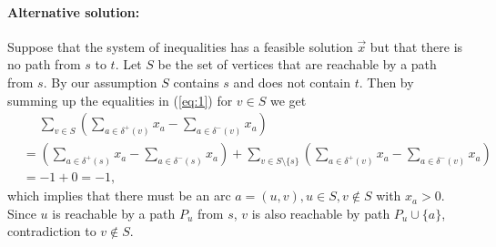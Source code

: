 \documentclass[11pt]{article}
\begin{document}
\begin{enumerate}[a)]
  \paragraph{Alternative solution:}
  Suppose that the system of inequalities has a feasible solution $\vec{x}$ but that there is no path from $s$ to $t$.
 Let $S$ be the set of vertices that are reachable by a path from $s$. By our assumption $S$ contains $s$ and does not
 contain $t$.
 Then by summing up the equalities in (\ref{eq:1}) for $v \in S$ we get
 \begin{align*}
 &\quad\; \sum_{v \in S} \left( \sum_{a \in \delta^{+}(v)} x_a  - \sum_{a \in \delta^{-}(v)} x_a \right) \\
 &= \left(\sum_{a \in \delta^{+}(s)} x_a  - \sum_{a \in \delta^{-}(s)} x_a \right) + \sum_{v \in S\setminus \{s\}} \left( \sum_{a \in \delta^{+}(v)} x_a  - \sum_{a \in \delta^{-}(v)} x_a \right) \\
 & = -1 + 0 = -1,
 \end{align*}
 which implies that there must be an arc $a=(u,v), u \in S, v \not\in S$ with $x_a > 0$. Since $u$ is reachable by a path $P_u$ from $s$, $v$ is also reachable by path $P_u \cup \{a\}$, contradiction to $v \not\in S$.

   \end{enumerate}
  
\end{document}
